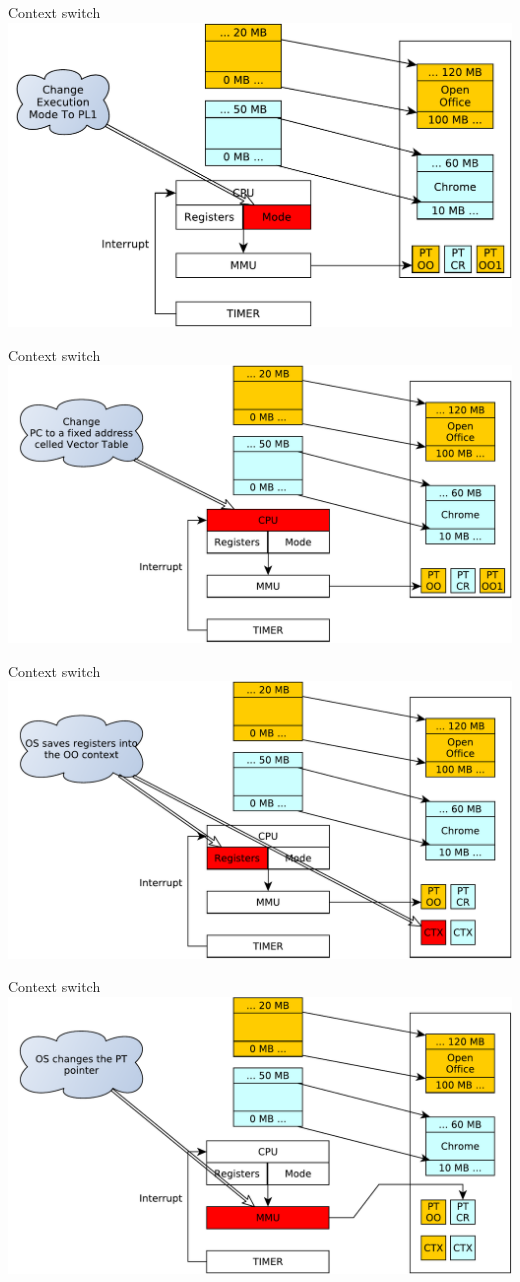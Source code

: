 \documentclass{beamer}
\begin{document}
\begin{frame}{Context switch}
  \includegraphics[width=0.7\linewidth]{switch1}
\end{frame}
\begin{frame}{Context switch}
  \includegraphics[width=0.7\linewidth]{switch2}
\end{frame}
\begin{frame}{Context switch}
  \includegraphics[width=0.7\linewidth]{switch3}
\end{frame}
\begin{frame}{Context switch}
  \includegraphics[width=0.7\linewidth]{switch4}
\end{frame}
\end{document}
